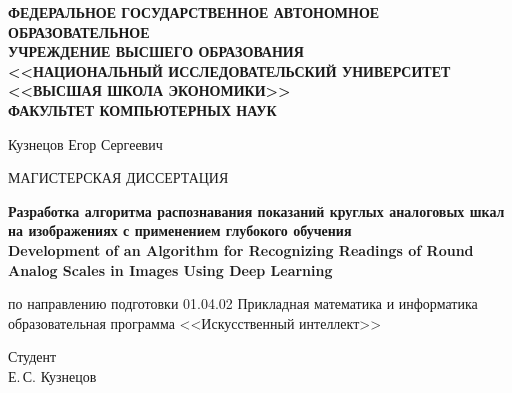 \documentclass[a4paper,14pt]{extarticle}
\begin{document}
	\begin{titlepage}
		\thispagestyle{empty}
		{
			\begin{center}
				{\bfseries
				ФЕДЕРАЛЬНОЕ ГОСУДАРСТВЕННОЕ АВТОНОМНОЕ ОБРАЗОВАТЕЛЬНОЕ\\
				УЧРЕЖДЕНИЕ ВЫСШЕГО ОБРАЗОВАНИЯ\\
				<<НАЦИОНАЛЬНЫЙ ИССЛЕДОВАТЕЛЬСКИЙ УНИВЕРСИТЕТ\\
				<<ВЫСШАЯ ШКОЛА ЭКОНОМИКИ>>\\
				ФАКУЛЬТЕТ КОМПЬЮТЕРНЫХ НАУК}
			\end{center}
			
			\vspace{1.0cm}
			
			\begin{center}
				{Кузнецов Егор Сергеевич}
			\end{center}

			\vspace{1.0cm}

			\begin{center}
				МАГИСТЕРСКАЯ ДИССЕРТАЦИЯ
			\end{center}

			\vspace{0.8cm}

			\begin{center}
				\begin{minipage}{0.96\textwidth}
					\centering
					{\textbf{Разработка алгоритма распознавания показаний круглых аналоговых шкал на изображениях с применением глубокого обучения}}\\[0.35em]
					{\textbf{Development of an Algorithm for Recognizing Readings of Round Analog Scales in Images Using Deep Learning}}
				\end{minipage}
			\end{center}

			\vspace{0.8cm}

			\begin{center}
				по направлению подготовки 01.04.02 Прикладная математика и информатика\\
				образовательная программа <<Искусственный интеллект>>
			\end{center}

			\vspace{1.0cm}

			\noindent
			\begin{minipage}[t]{0.42\textwidth}
				Студент\\
				Е.\,С. Кузнецов
			\end{minipage}

}
\end{titlepage}
\end{document}
